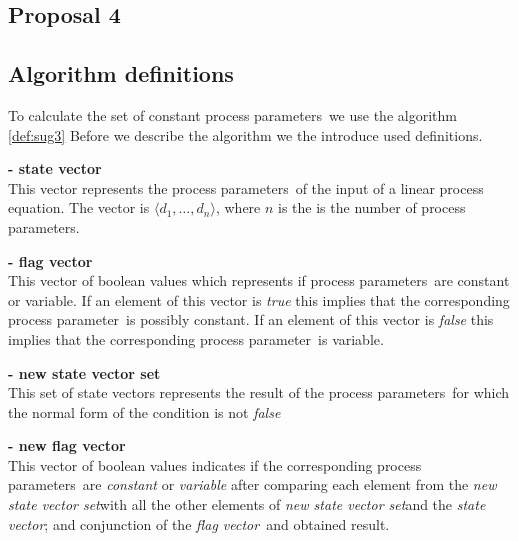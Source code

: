 \documentclass[a4paper,10pt]{article}
\newcommand{\lpe}{linear process equation}
\newcommand{\ovr}{\overrightarrow}
\newcommand{\pp}{process parameter}
\newcommand{\pps}{process parameters}
\newcommand{\ti}{\textit}
\newcommand{\sv}{\textit{state vector}}
\newcommand{\fv}{\textit{flag vector}}
\newcommand{\svs}{\textit{new state vector set}}
\begin{document}
\subsection{Proposal 4}



\subsection{Algorithm definitions}
To calculate the set of constant \pps\ we use the algorithm
\ref{def:sug3} Before we describe the algorithm we the introduce
used definitions. 

\begin{defn} \textbf{- state vector} \label{sv}\\
This vector represents the \pps\ of the input of a \lpe . The vector is 
$\langle d_1, \ldots, d_n \rangle$, where $n$ is the is the number
of \pps . 
\end{defn}

\begin{defn} \textbf{- flag vector}\\
This vector of boolean values which represents if \pps\
are constant or variable. If an element of this vector is \ti{true}
this implies that the corresponding \pp\ is possibly constant. If an element
of this vector is \ti{false} this implies that the corresponding
\pp\ is variable.
\end{defn}

\begin{defn} \textbf{- new state vector set}\\
 This set of state vectors represents the result of the
\pps\ for which the normal form of the condition is not \ti{false}
\end{defn} 

\begin{defn}
\textbf{- new flag vector} \\
This vector of boolean values indicates if the
corresponding \pps\ are \ti{constant} or \ti{variable} after comparing each element from the \svs with all the other elements of \svs  and the \sv; and conjunction of the \fv\ and obtained result. 
\end{defn}
\end{document}
